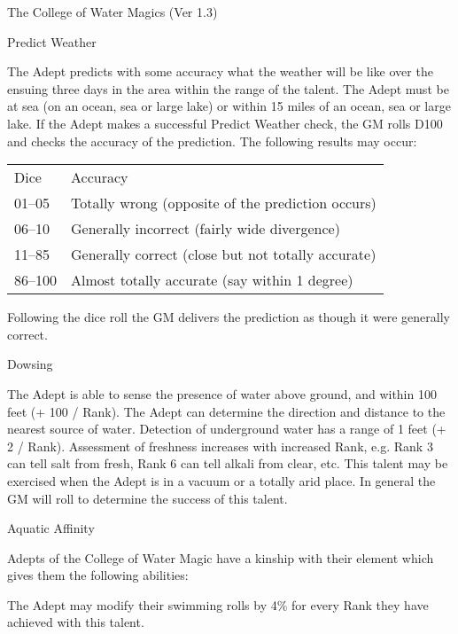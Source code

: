 \begin{Chapter}{The College of Water Magics (Ver 1.3)}
\begin{talent}[T-1]{Predict Weather}

\begin{effects}
The Adept predicts with some accuracy what the weather will be like
over the ensuing three days in the area within the range of the
talent.  The Adept must be at sea (on an ocean, sea or large lake) or
within 15 miles of an ocean, sea or large lake.  If the Adept makes a
successful Predict Weather check, the GM rolls D100 and checks the
accuracy of the prediction.  The following results may occur:

\begin{tabularx}{\columnwidth}{lX}
Dice	& Accuracy \\
01--05	& Totally wrong (opposite of the prediction occurs) \\
06--10	& Generally incorrect (fairly wide divergence) \\
11--85	& Generally correct (close but not totally accurate) \\
86--100	& Almost totally accurate (say within 1 degree) \\
\end{tabularx}

Following the dice roll the GM delivers the prediction as though it
were generally correct.
\end{effects}
\end{talent}

\begin{talent}[T-2]{Dowsing}

\begin{effects}
The Adept is able to sense the presence of water above ground, and
within 100 feet (+ 100 / Rank).  The Adept can determine the direction
and distance to the nearest source of water.  Detection of underground
water has a range of 1 feet (+ 2 / Rank).  Assessment of freshness
increases with increased Rank, e.g. Rank 3 can tell salt from fresh,
Rank 6 can tell alkali from clear, etc.  This talent may be exercised
when the Adept is in a vacuum or a totally arid place.  In general the
GM will roll to determine the success of this talent.
\end{effects}
\end{talent}

\begin{talent}[T-3]{Aquatic Affinity}

\begin{effects}
Adepts of the College of Water Magic have a kinship with their element
which gives them the following abilities:
\begin{Enumerate}
\item The Adept may modify their swimming rolls by 4\% for every Rank
  they have achieved with this talent.


\end{Enumerate}
\end{effects}
\end{talent}
\end{Chapter}
